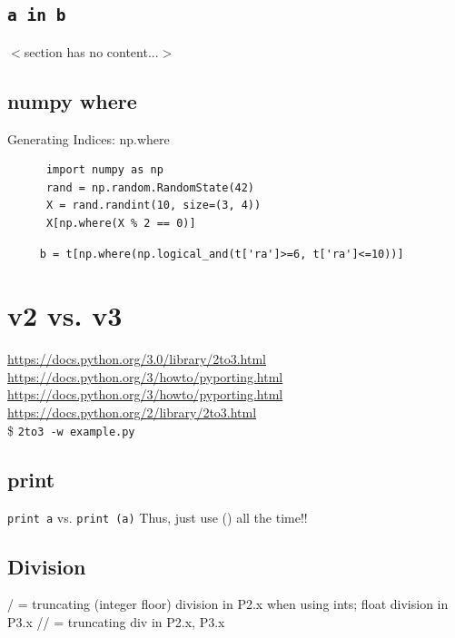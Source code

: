 \documentclass[11pt,a4paper]{article}
\begin{document}
    \subsection{{\tt a in b}}
    $<$section has no content...$>$

    \subsection{numpy where}
      Generating Indices: np.where
    \begin{lstlisting}
      import numpy as np
      rand = np.random.RandomState(42)
      X = rand.randint(10, size=(3, 4))
      X[np.where(X % 2 == 0)]
    \end{lstlisting}
    \begin{lstlisting}
     b = t[np.where(np.logical_and(t['ra']>=6, t['ra']<=10))]
    \end{lstlisting}







\newpage
\section{v2 vs. v3}
\href{https://docs.python.org/3.0/library/2to3.html}{https://docs.python.org/3.0/library/2to3.html}\\
\href{https://docs.python.org/3/howto/pyporting.html}{https://docs.python.org/3/howto/pyporting.html}\\
\href{https://docs.python.org/3/howto/pyporting.html}{https://docs.python.org/3/howto/pyporting.html}
\href{https://docs.python.org/2/library/2to3.html}{https://docs.python.org/2/library/2to3.html}\\

\$ {\tt 2to3 -w example.py}\\


    \subsection{print}
    {\tt print a} vs. {\tt print (a)}
    Thus, just use () all the time!!
    
    \subsection{Division}
    / = truncating (integer floor) division in P2.x when using ints; float division in P3.x
    // = truncating div in P2.x, P3.x 
    
\end{document}
